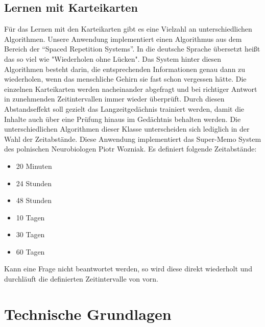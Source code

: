\subsection{Lernen mit Karteikarten}
Für das Lernen mit den Karteikarten gibt es eine Vielzahl an unterschiedlichen Algorithmen. Unsere Anwendung implementiert einen Algorithmus aus dem Bereich der \enquote{Spaced Repetition Systems}. In die deutsche Sprache übersetzt heißt das so viel wie "Wiederholen ohne Lücken". Das System hinter diesen Algorithmen besteht darin, die entsprechenden Informationen genau dann zu wiederholen, wenn das menschliche Gehirn sie fast schon vergessen hätte.\autocite[Vgl.][]{Tabibian3988} Die einzelnen Karteikarten werden nacheinander abgefragt und bei richtiger Antwort in zunehmenden Zeitintervallen immer wieder überprüft. Durch diesen Abstandseffekt soll gezielt das Langzeitgedächnis trainiert werden, damit die Inhalte auch über eine Prüfung hinaus im Gedächtnis behalten werden. Die unterschiedlichen Algorithmen dieser Klasse unterscheiden sich lediglich in der Wahl der Zeitabstände. 
Diese Anwendung implementiert das Super-Memo System des polnischen Neurobiologen Piotr Wozniak. Es definiert folgende Zeitabstände:
\begin{itemize}
	\item 20 Minuten
	\item 24 Stunden
	\item 48 Stunden
	\item 10 Tagen
	\item 30 Tagen
	\item 60 Tagen
\end{itemize}  
Kann eine Frage nicht beantwortet werden, so wird diese direkt wiederholt und durchläuft die definierten Zeitintervalle von vorn. \autocite[Vgl.][]{BaileyuDavey}



\section{Technische Grundlagen}


